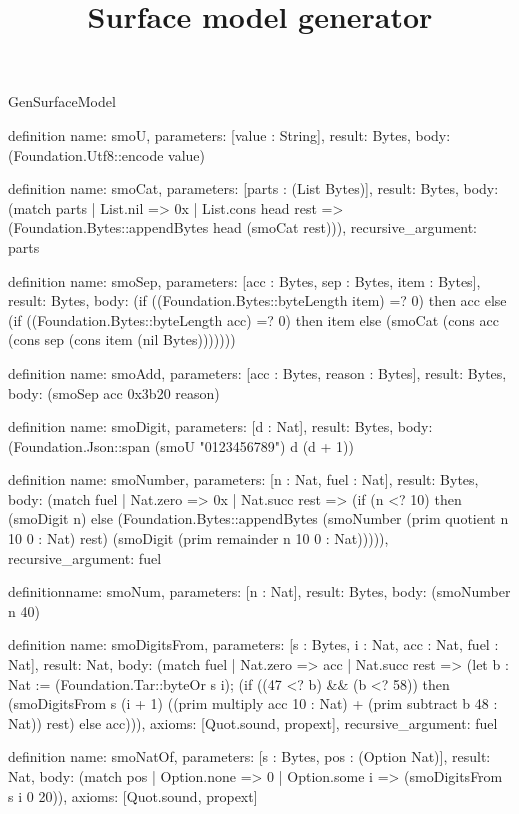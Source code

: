 \begin{lexlean}{GenSurfaceModel}
\title{Surface model generator}
\begin{semanticmodule}
definition{
  name: smoU,
  parameters: [value : String],
  result: Bytes,
  body: (Foundation.Utf8::encode value)
}

definition{
  name: smoCat,
  parameters: [parts : (List Bytes)],
  result: Bytes,
  body: (match parts
    | List.nil => 0x
    | List.cons head rest => (Foundation.Bytes::appendBytes head (smoCat rest))),
  recursive_argument: parts
}

definition{
  name: smoSep,
  parameters: [acc : Bytes, sep : Bytes, item : Bytes],
  result: Bytes,
  body: (if ((Foundation.Bytes::byteLength item) =? 0) then acc else (if ((Foundation.Bytes::byteLength acc) =? 0) then item else (smoCat (cons acc (cons sep (cons item (nil Bytes)))))))
}

definition{
  name: smoAdd,
  parameters: [acc : Bytes, reason : Bytes],
  result: Bytes,
  body: (smoSep acc 0x3b20 reason)
}

definition{
  name: smoDigit,
  parameters: [d : Nat],
  result: Bytes,
  body: (Foundation.Json::span (smoU "0123456789") d (d + 1))
}

definition{
  name: smoNumber,
  parameters: [n : Nat, fuel : Nat],
  result: Bytes,
  body: (match fuel
    | Nat.zero => 0x
    | Nat.succ rest => (if (n <? 10) then (smoDigit n) else (Foundation.Bytes::appendBytes (smoNumber (prim quotient n 10 0 : Nat) rest) (smoDigit (prim remainder n 10 0 : Nat))))),
  recursive_argument: fuel
}

definition{name: smoNum, parameters: [n : Nat], result: Bytes, body: (smoNumber n 40)}

definition{
  name: smoDigitsFrom,
  parameters: [s : Bytes, i : Nat, acc : Nat, fuel : Nat],
  result: Nat,
  body: (match fuel
    | Nat.zero => acc
    | Nat.succ rest => (let b : Nat := (Foundation.Tar::byteOr s i); (if ((47 <? b) && (b <? 58)) then (smoDigitsFrom s (i + 1) ((prim multiply acc 10 : Nat) + (prim subtract b 48 : Nat)) rest) else acc))),
  axioms: [Quot.sound, propext],
  recursive_argument: fuel
}

definition{
  name: smoNatOf,
  parameters: [s : Bytes, pos : (Option Nat)],
  result: Nat,
  body: (match pos | Option.none => 0 | Option.some i => (smoDigitsFrom s i 0 20)),
  axioms: [Quot.sound, propext]
}


\end{semanticmodule}
\end{lexlean}
